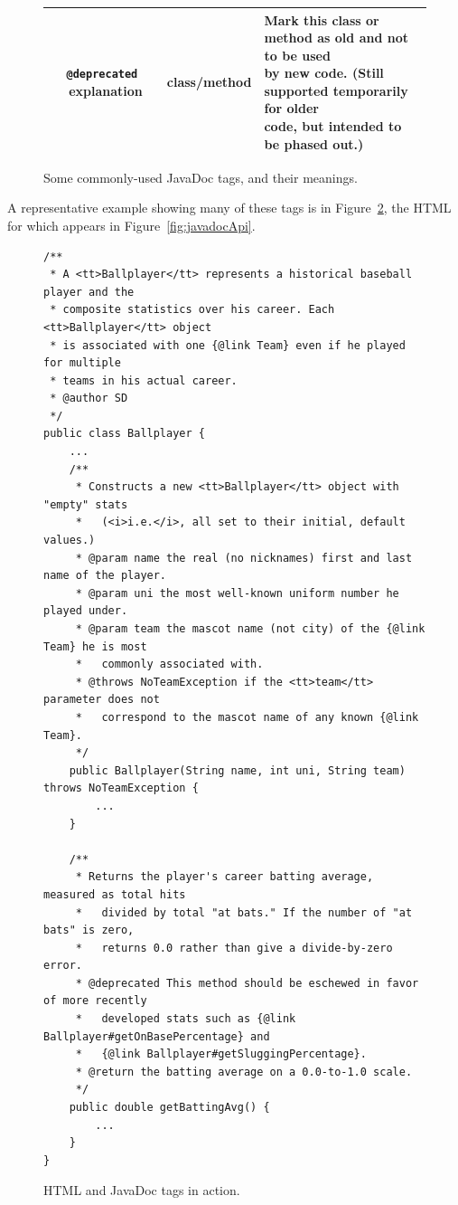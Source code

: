 \begin{figure}[ht]
\begin{tabular}{|c|c|l|}
\hline

\index{deprecated tag@\texttt{"@deprecated} tag}
\texttt{@deprecated} \ explanation & class/method & 
\makecell[l]{
Mark this class or method as old and not to be used\\
by new code. (Still supported temporarily for older\\
code, but intended to be phased out.)}\\

\hline

\end{tabular}
\vspace{.1in}
\caption{Some commonly-used JavaDoc tags, and their meanings.}
\label{fig:taglist}
\end{figure}
\normalsize

A representative example showing many of these tags is in
Figure~\ref{fig:javadocTags}, the HTML for which appears in
Figure~\ref{fig:javadocApi}.

\begin{figure}
\begin{Verbatim}[fontsize=\footnotesize,samepage=true,frame=single]
/**
 * A <tt>Ballplayer</tt> represents a historical baseball player and the
 * composite statistics over his career. Each <tt>Ballplayer</tt> object
 * is associated with one {@link Team} even if he played for multiple
 * teams in his actual career.
 * @author SD
 */
public class Ballplayer {
    ...
    /**
     * Constructs a new <tt>Ballplayer</tt> object with "empty" stats
     *   (<i>i.e.</i>, all set to their initial, default values.)
     * @param name the real (no nicknames) first and last name of the player.
     * @param uni the most well-known uniform number he played under.
     * @param team the mascot name (not city) of the {@link Team} he is most
     *   commonly associated with.
     * @throws NoTeamException if the <tt>team</tt> parameter does not
     *   correspond to the mascot name of any known {@link Team}.
     */
    public Ballplayer(String name, int uni, String team) throws NoTeamException {
        ...
    }
    
    /**
     * Returns the player's career batting average, measured as total hits
     *   divided by total "at bats." If the number of "at bats" is zero,
     *   returns 0.0 rather than give a divide-by-zero error.
     * @deprecated This method should be eschewed in favor of more recently
     *   developed stats such as {@link Ballplayer#getOnBasePercentage} and
     *   {@link Ballplayer#getSluggingPercentage}.
     * @return the batting average on a 0.0-to-1.0 scale.
     */
    public double getBattingAvg() {
        ...
    }
}
\end{Verbatim}

\caption{HTML and JavaDoc tags in action.}
\label{fig:javadocTags}
\end{figure}


